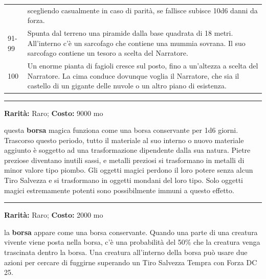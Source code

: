 \begin{multicols}{2}
\begin{tabularx}{0.50\textwidth}{lX}
& scegliendo casualmente in caso di parità, se fallisce subisce 10d6 danni da forza.\\
91-99 &Spunta dal terreno una piramide dalla base quadrata di 18 metri. All'interno c'è un sarcofago che contiene una mummia sovrana. Il suo sarcofago contiene un tesoro a scelta del Narratore.\\
100 &Un enorme pianta di fagioli cresce sul posto, fino a un'altezza a scelta del Narratore. La cima conduce dovunque voglia il Narratore, che sia il castello di un gigante delle nuvole o un altro piano di esistenza.
\end{tabularx}


\medskip


\smallskip\noindent\rule{\linewidth}{2pt}  \hypertarget{Borsadell'Annullamento}{}\medskip{}\noindent\label{Borsadell'Annullamento}

\textbf{Rarità:} Raro; \textbf{Costo:} 9000 mo

questa \textbf{borsa} magica funziona come una borsa conservante per 1d6 giorni. Trascorso questo periodo, tutto il materiale al suo interno o nuovo materiale aggiunto è soggetto ad una trasformazione dipendente dalla sua natura. Pietre preziose diventano inutili sassi, e metalli preziosi si trasformano in metalli di minor valore tipo piombo. Gli oggetti magici perdono il loro potere senza alcun Tiro Salvezza e si trasformano in oggetti mondani del loro tipo. Solo oggetti magici estremamente potenti sono possibilmente immuni a questo effetto.

\smallskip\noindent\rule{\linewidth}{2pt}  \hypertarget{BorsaDivorante}{}\medskip{}\noindent\label{BorsaDivorante}

\textbf{Rarità:} Raro; \textbf{Costo:} 2000 mo

la \textbf{borsa} appare come una borsa conservante. Quando una parte di una creatura vivente viene posta nella borsa, c'è una probabilità del 50\% che la creatura venga trascinata dentro la borsa. Una creatura all'interno della borsa può usare due azioni per cercare di fuggirne superando un Tiro Salvezza Tempra con Forza DC 25.


\end{multicols}
